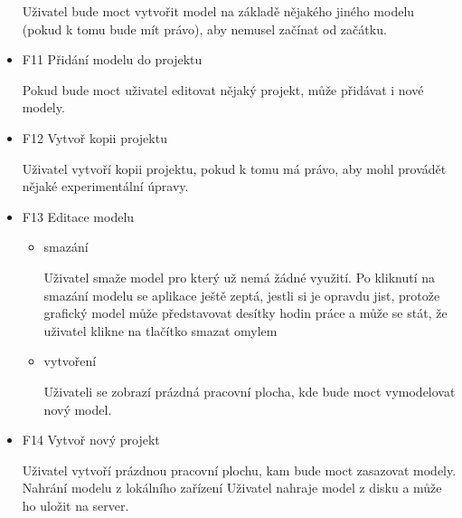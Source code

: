\documentclass[thesis=B,czech]{FITthesis}[2012/06/26]
\begin{document}
\begin{itemize}
                Uživatel bude moct vytvořit model na základě nějakého jiného modelu (pokud k tomu bude mít právo), aby nemusel začínat od začátku.
                \item F11 Přidání modelu do projektu
                
                Pokud bude moct uživatel editovat nějaký projekt, může přidávat i nové modely.
               \item F12 Vytvoř kopii projektu
               
                Uživatel vytvoří kopii projektu, pokud k tomu má právo, aby mohl provádět nějaké experimentální úpravy.
               \item F13 Editace modelu
               
               \begin{itemize}
                    \item smazání
                   
                    Uživatel smaže model pro který už nemá žádné využití. Po kliknutí na smazání modelu se aplikace ještě zeptá, jestli si je opravdu jist, protože grafický model může představovat desítky hodin práce a může se stát, že uživatel klikne na tlačítko smazat omylem
                    \item vytvoření
                    
                    Uživateli se zobrazí prázdná pracovní plocha, kde bude moct vymodelovat nový model.
                \end{itemize}
                \item F14 Vytvoř nový projekt
                
                Uživatel vytvoří prázdnou pracovní plochu, kam bude moct zasazovat modely.
                Nahrání modelu z lokálního zařízení
                Uživatel nahraje model z disku a může ho uložit na server.
            \end{itemize}
\end{document}
